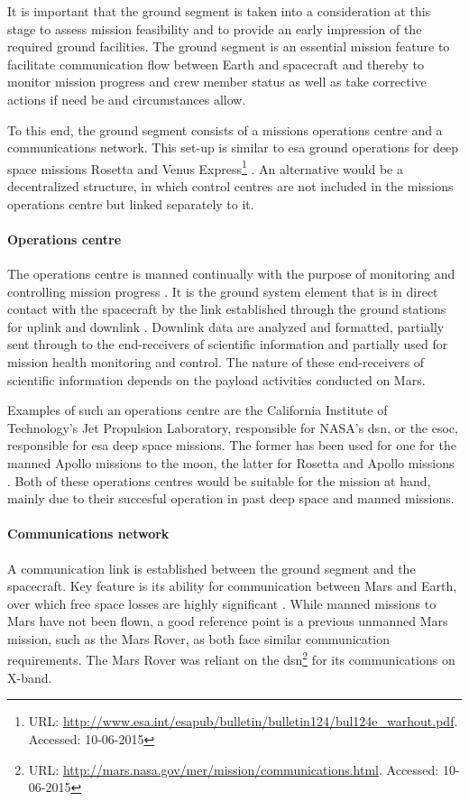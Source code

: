 It is important that the ground segment is taken into a consideration at this stage to assess mission feasibility and to provide an early impression of the required ground facilities. The ground segment is an essential mission feature to facilitate communication flow between Earth and spacecraft and thereby to monitor mission progress and crew member status as well as take corrective actions if need be and circumstances allow.

To this end, the ground segment consists of a missions operations centre and a communications network. This set-up is similar to \gls{esa} ground operations for deep space missions Rosetta and Venus Express\footnote{URL: \url{http://www.esa.int/esapub/bulletin/bulletin124/bul124e_warhout.pdf}. Accessed: 10-06-2015}  \cite{Warhaut2007}. An alternative would be a decentralized structure, in which control centres are not included in the missions operations centre but linked separately to it. 

\paragraph{Operations centre}
The operations centre is manned continually with the purpose of monitoring and controlling mission progress \cite{Warhaut2007}. It is the ground system element that is in direct contact with the spacecraft by the link established through the ground stations for uplink and downlink \cite[p.879]{Wertz2011}. Downlink data are analyzed and formatted, partially sent through to the end-receivers of scientific information and partially used for mission health monitoring and control. The nature of these end-receivers of scientific information depends on the payload activities conducted on Mars. 

Examples of such an operations centre are the California Institute of Technology's Jet Propulsion Laboratory, responsible for NASA's \gls{dsn}, or the \gls{esoc}, responsible for \gls{esa} deep space missions. The former has been used for one for the manned Apollo missions to the moon, the latter for Rosetta and Apollo missions \cite{Wertz2011,Warhaut2007}. Both of these operations centres would be suitable for the mission at hand, mainly due to their succesful operation in past deep space and manned missions. 

\paragraph{Communications network}
A communication link is established between the ground segment and the spacecraft. Key feature is its ability for communication between Mars and Earth, over which free space losses are highly significant \cite{Wertz2011}. While manned missions to Mars have not been flown, a good reference point is a previous unmanned Mars mission, such as the Mars Rover, as both face similar communication requirements. The Mars Rover was reliant on the \gls{dsn}\footnote{URL: \url{http://mars.nasa.gov/mer/mission/communications.html}. Accessed: 10-06-2015} for its communications on X-band. 

